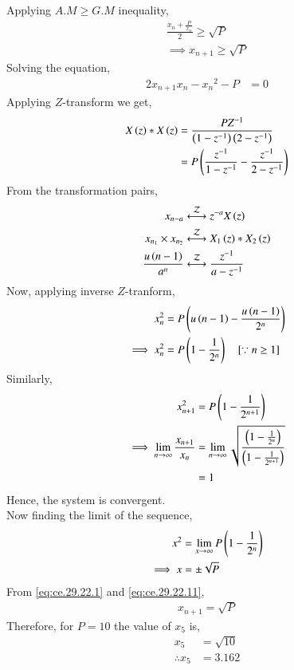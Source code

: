 \documentclass[journal,12pt,twocolumn]{IEEEtran}
\theoremstyle{remark}
\begin{document}
Applying $A.M \geq G.M$ inequality,
\begin{align}
    \frac{x_n+\frac{P}{x_n}}{2} \geq \sqrt{P}   \\
    \implies x_{n+1} \geq \sqrt{P}  \label{eq:ce.29.22.1}
\end{align}
Solving the equation,
\begin{align}
    2x_{n+1}x_{n} - {x_n}^2 - P &=0
\end{align}
Applying $Z$-transform we get,
\begin{align}
    X\left(z\right) \ast X\left(z\right) &= \frac{PZ^{-1}}{\left(1-z^{-1}\right)\left(2-z^{-1}\right)}  \\
    &= P\left(\frac{z^{-1}}{1-z^{-1}} - \frac{z^{-1}}{2-z^{-1}}\right)
\end{align}
From the transformation pairs,
\begin{align}
    x_{n-a} &\overset{\mathcal{Z}}{ \longleftrightarrow} z^{-a}X\left(z\right)  \\
    x_{n_1}\times x_{n_2} &\overset{\mathcal{Z}}{ \longleftrightarrow} X_1\left(z\right)\ast X_2\left(z\right) \\
    \frac{u\left(n-1\right)}{a^{n}} &\overset{\mathcal{Z}}{ \longleftrightarrow} \frac{z^{-1}}{a-z^{-1}}
\end{align}
Now, applying inverse $Z$-tranform,
\begin{align}
    x_n^2 &= P\left(u\left(n-1\right) - \frac{u\left(n-1\right)}{2^n}\right)  \\
    \implies x_n^2 &=P\left(1-\frac{1}{2^n}\right) \quad \text{[$\because n \geq 1$]}
\end{align}
Similarly,
\begin{align}
    x_{n+1}^2 &= P\left(1 - \frac{1}{2^{n+1}}\right)  \\
    \implies \lim\limits_{n\to\infty}\frac{x_{n+1}}{x_n} &= \lim\limits_{n\to\infty}\sqrt{\frac{\left(1-\frac{1}{2^n}\right)}{\left(1-\frac{1}{2^{n+1}}\right)}}    \\
    &=1
\end{align}
Hence, the system is convergent.    \\
Now finding the limit of the sequence,
\begin{align}
    x^2 &=\lim\limits_{x\to\infty}P\left(1-\frac{1}{2^n}\right)   \\
    \implies x &= \pm\sqrt{P}   \label{eq:ce.29.22.11}
\end{align}
From \eqref{eq:ce.29.22.1} and \eqref{eq:ce.29.22.11},
\begin{align}
    x_{n+1}=\sqrt{P}
\end{align}
Therefore, for $P=10$ the value of $x_5$ is,
\begin{align}
    x_5&=\sqrt{10}  \\
    \therefore x_5&=3.162
\end{align}
\end{document}
